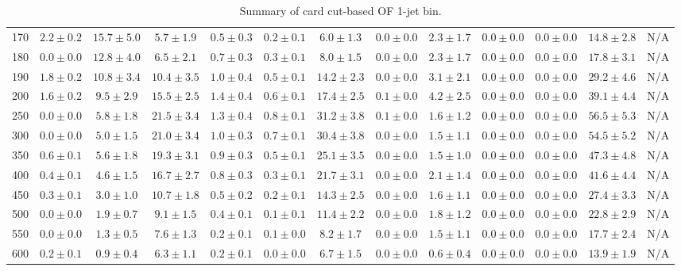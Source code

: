 \begin{table}
{\begin{center}
\begin{tabular}{l | c c | c c c c c c c c  | c c}
170 & $2.2\pm0.2$ & $15.7\pm5.0$ & $5.7\pm1.9$ & $0.5\pm0.3$ & $0.2\pm0.1$ & $6.0\pm1.3$ & $0.0\pm0.0$ & $2.3\pm1.7$ & $0.0\pm0.0$ & $0.0\pm0.0$ & $14.8\pm2.8$ & N/A \\
180 & $0.0\pm0.0$ & $12.8\pm4.0$ & $6.5\pm2.1$ & $0.7\pm0.3$ & $0.3\pm0.1$ & $8.0\pm1.5$ & $0.0\pm0.0$ & $2.3\pm1.7$ & $0.0\pm0.0$ & $0.0\pm0.0$ & $17.8\pm3.1$ & N/A \\
190 & $1.8\pm0.2$ & $10.8\pm3.4$ & $10.4\pm3.5$ & $1.0\pm0.4$ & $0.5\pm0.1$ & $14.2\pm2.3$ & $0.0\pm0.0$ & $3.1\pm2.1$ & $0.0\pm0.0$ & $0.0\pm0.0$ & $29.2\pm4.6$ & N/A \\
200 & $1.6\pm0.2$ & $9.5\pm2.9$ & $15.5\pm2.5$ & $1.4\pm0.4$ & $0.6\pm0.1$ & $17.4\pm2.5$ & $0.1\pm0.0$ & $4.2\pm2.5$ & $0.0\pm0.0$ & $0.0\pm0.0$ & $39.1\pm4.4$ & N/A \\
250 & $0.0\pm0.0$ & $5.8\pm1.8$ & $21.5\pm3.4$ & $1.3\pm0.4$ & $0.8\pm0.1$ & $31.2\pm3.8$ & $0.1\pm0.0$ & $1.6\pm1.2$ & $0.0\pm0.0$ & $0.0\pm0.0$ & $56.5\pm5.3$ & N/A \\
300 & $0.0\pm0.0$ & $5.0\pm1.5$ & $21.0\pm3.4$ & $1.0\pm0.3$ & $0.7\pm0.1$ & $30.4\pm3.8$ & $0.0\pm0.0$ & $1.5\pm1.1$ & $0.0\pm0.0$ & $0.0\pm0.0$ & $54.5\pm5.2$ & N/A \\
350 & $0.6\pm0.1$ & $5.6\pm1.8$ & $19.3\pm3.1$ & $0.9\pm0.3$ & $0.5\pm0.1$ & $25.1\pm3.5$ & $0.0\pm0.0$ & $1.5\pm1.0$ & $0.0\pm0.0$ & $0.0\pm0.0$ & $47.3\pm4.8$ & N/A \\
400 & $0.4\pm0.1$ & $4.6\pm1.5$ & $16.7\pm2.7$ & $0.8\pm0.3$ & $0.3\pm0.1$ & $21.7\pm3.1$ & $0.0\pm0.0$ & $2.1\pm1.4$ & $0.0\pm0.0$ & $0.0\pm0.0$ & $41.6\pm4.4$ & N/A \\
450 & $0.3\pm0.1$ & $3.0\pm1.0$ & $10.7\pm1.8$ & $0.5\pm0.2$ & $0.2\pm0.1$ & $14.3\pm2.5$ & $0.0\pm0.0$ & $1.6\pm1.1$ & $0.0\pm0.0$ & $0.0\pm0.0$ & $27.4\pm3.3$ & N/A \\
500 & $0.0\pm0.0$ & $1.9\pm0.7$ & $9.1\pm1.5$ & $0.4\pm0.1$ & $0.1\pm0.1$ & $11.4\pm2.2$ & $0.0\pm0.0$ & $1.8\pm1.2$ & $0.0\pm0.0$ & $0.0\pm0.0$ & $22.8\pm2.9$ & N/A \\
550 & $0.0\pm0.0$ & $1.3\pm0.5$ & $7.6\pm1.3$ & $0.2\pm0.1$ & $0.1\pm0.0$ & $8.2\pm1.7$ & $0.0\pm0.0$ & $1.5\pm1.1$ & $0.0\pm0.0$ & $0.0\pm0.0$ & $17.7\pm2.4$ & N/A \\
600 & $0.2\pm0.1$ & $0.9\pm0.4$ & $6.3\pm1.1$ & $0.2\pm0.1$ & $0.0\pm0.0$ & $6.7\pm1.5$ & $0.0\pm0.0$ & $0.6\pm0.4$ & $0.0\pm0.0$ & $0.0\pm0.0$ & $13.9\pm1.9$ & N/A \\
\hline
\end{tabular}
\end{center}
}
\caption{Summary of card cut-based OF 1-jet bin.}
\end{table}
